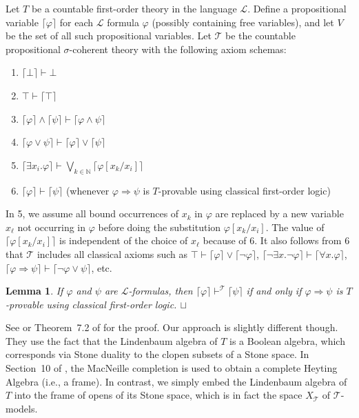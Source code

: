 \documentclass{article}
\theoremstyle{plain}
\newtheorem{lemma}[Theorem]{Lemma}
\def\squareforqed{\hbox{\rlap{$\sqcap$}$\sqcup$}}
\def\qed{\ifmmode\squareforqed\else{\unskip\nobreak\hfil
\penalty50\hskip1em\null\nobreak\hfil\squareforqed
\parfillskip=0pt\finalhyphendemerits=0\endgraf}\fi}
\def\cal#1{{\mathcal #1}}
\def\IN{{\mathbb N}}
\def\calL{{\cal L}}
\def\calT{{\cal T}}
\def\token#1{\lceil#1\rceil}
\begin{document}
Let $T$ be a countable first-order theory in the language $\calL$. Define a propositional variable $\token{\varphi}$ for each $\calL$ formula $\varphi$ (possibly containing free variables), and let $V$ be the set of all such propositional variables. Let $\calT$ be the countable propositional $\sigma$-coherent theory with the following axiom schemas:
\begin{enumerate}
\item
$\token{\bot}\vdash \bot$
\item
$\top\vdash \token{\top}$
\item
$\token{\varphi}\wedge\token{\psi}\vdash \token{\varphi\wedge\psi}$
\item
$\token{\varphi\vee\psi}\vdash \token{\varphi}\vee\token{\psi}$
\item
$\token{\exists x_i.\varphi}\vdash \bigvee_{k\in\IN} \token{\varphi[x_k/x_i]}$
\item
$\token{\varphi}\vdash \token{\psi}$ (whenever $\varphi \Rightarrow \psi$ is $T$-provable using classical first-order logic)
\end{enumerate}
In 5, we assume all bound occurrences of $x_k$ in $\varphi$ are replaced by a new variable $x_\ell$ not occurring in $\varphi$ before doing the substitution $\varphi[x_k/x_i]$. The value of $\token{\varphi[x_k/x_i]}$ is independent of the choice of $x_\ell$ because of 6. It also follows from 6 that $\calT$ includes all classical axioms such as $\top \vdash \token{\varphi}\vee\token{\neg\varphi}$, $\token{\neg \exists x. \neg \varphi} \vdash \token{\forall x.\varphi}$, $\token{\varphi\Rightarrow\psi} \vdash \token{\neg\varphi\vee\psi}$, etc.

\begin{lemma}
If $\varphi$ and $\psi$ are $\calL$-formulas, then $\token{\varphi}\vdash^\calT \token{\psi}$ if and only if $\varphi\Rightarrow\psi$ is $T$-provable using classical first-order logic. 
\qed
\end{lemma}
See \cite{RS51} or Theorem~7.2 of \cite{S08} for the proof. Our approach is slightly different though. They use the fact that the Lindenbaum algebra of $T$ is a Boolean algebra, which corresponds via Stone duality to the clopen subsets of a Stone space. In Section~10 of \cite{S08}, the MacNeille completion is used to obtain a complete Heyting Algebra (i.e., a frame).  In contrast, we simply embed the Lindenbaum algebra of $T$ into the frame of opens of its Stone space, which is in fact the space $X_\calT$ of $\calT$-models.
\end{document}
